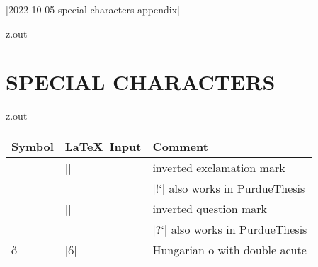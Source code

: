 [2022-10-05 special characters appendix]

\begin{VerbatimOut}{z.out}
\chapter{SPECIAL CHARACTERS}
\end{VerbatimOut}

\MyIO


\begin{VerbatimOut}{z.out}
\begin{tabular}{@{}lll@{}}
  \toprule
  \textbf{Symbol}  & \textbf{\LaTeX\ Input}& \textbf{Comment}\\
  \midrule
  \textexclamdown  & |\textexclamdown|     & inverted exclamation mark\\
                   &                       & |!`| also works in PurdueThesis\\
  \textquestiondown& |\textquestiondown|   & inverted question mark\\
                   &                       & |?`| also works in PurdueThesis\\
  \H{o}            & |\H{o}|               & Hungarian o with double acute\\
  \bottomrule
\end{tabular}
\index{\verb+\begin{tabular}+}
\end{VerbatimOut}

\MyIO
